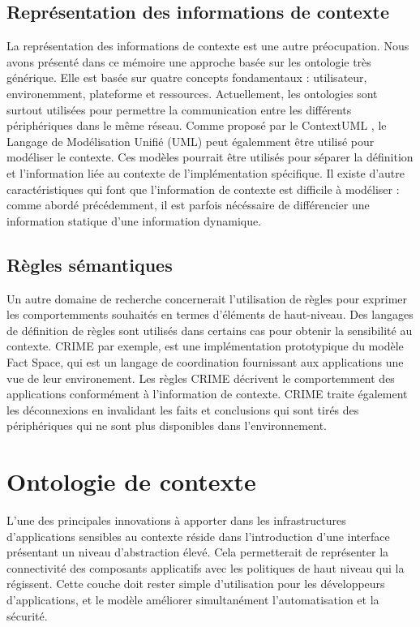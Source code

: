 \subsection{Représentation des informations de contexte}

La représentation des informations de contexte est une autre préocupation. Nous
avons présenté dans ce mémoire une approche basée sur les ontologie très
générique. Elle est basée sur quatre concepts fondamentaux : utilisateur,
environemment, plateforme et ressources. Actuellement, les ontologies sont
surtout utilisées pour permettre la communication entre les différents
périphériques dans le même réseau. Comme proposé par le ContextUML
\cite{sheng_contextuml:_2005}, le Langage de Modélisation Unifié (UML) peut
égalemment être utilisé pour modéliser le contexte. Ces modèles pourrait être
utilisés pour séparer la définition et l'information liée au contexte de
l'implémentation spécifique. Il existe d'autre caractéristiques qui font que
l'information de contexte est difficile à modéliser : comme abordé précédemment,
il est parfois nécéssaire de différencier une information statique d'une
information dynamique.

\subsection{Règles sémantiques}

Un autre domaine de recherche concernerait l'utilisation de règles pour exprimer
les comportemments souhaités en termes d'éléments de haut-niveau. Des langages
de définition de règles sont utilisés dans certains cas pour obtenir la
sensibilité au contexte. CRIME \cite{murphy_coordination_2007} par exemple, est
une implémentation prototypique du modèle Fact Space, qui est un langage de
coordination fournissant aux applications une vue de leur environement. Les
règles CRIME décrivent le comportemment des applications conformément à
l'information de contexte. CRIME traite également les déconnexions en invalidant
les faits et conclusions qui sont tirés des périphériques qui ne sont plus
disponibles dans l'environnement.

\section{Ontologie de contexte}

L'une des principales innovations à apporter dans les infrastructures
d'applications sensibles au contexte réside dans l'introduction d'une interface
présentant un niveau d'abstraction élevé. Cela permetterait de représenter la
connectivité des composants applicatifs avec les politiques de haut niveau qui
la régissent.  Cette couche doit rester simple d'utilisation pour les
développeurs d'applications, et le modèle améliorer simultanément
l'automatisation et la sécurité.

